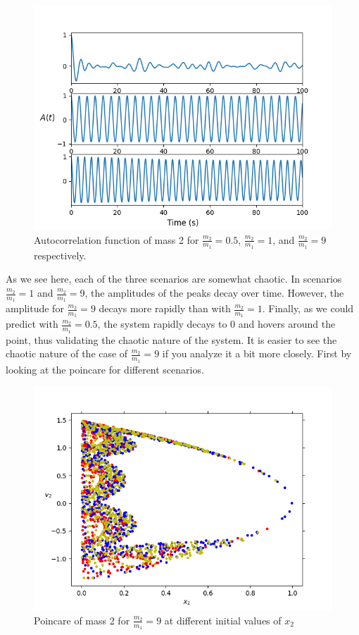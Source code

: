 \documentclass[pra,twocolumn,showpacs,amsmath,amssymb]{revtex4-2}
\begin{document}
\begin{figure}[t!]
\includegraphics[scale=0.50]{corr.png}
\caption{Autocorrelation function of mass 2 for \(\frac{m_2}{m_1} = 0.5\), \(\frac{m_2}{m_1} = 1\), and \(\frac{m_2}{m_1} = 9\) respectively.}\label{autocorr}
\end{figure}

As we see here, each of the three scenarios are somewhat chaotic. In scenarios \(\frac{m_2}{m_1} = 1\) and \(\frac{m_2}{m_1} = 9\), the amplitudes of the peaks decay over time. However, the amplitude for \(\frac{m_2}{m_1} = 9\) decays more rapidly than with \(\frac{m_2}{m_1} = 1\). Finally, as we could predict with \(\frac{m_2}{m_1} = 0.5\), the system rapidly decays to 0 and hovers around the point, thus validating the chaotic nature of the system.
\p It is easier to see the chaotic nature of the case of $ \frac{m_2}{m_1} = 9 $ if you analyze it a bit more closely. First by looking at the poincare for different scenarios.

\begin{figure}[t!]
\includegraphics[scale=0.50]{poincare.png}
\caption{Poincare of mass 2 for \(\frac{m_2}{m_1} = 9\) at different initial values of $x_2$}\label{poin9}
\end{figure}
\end{document}
